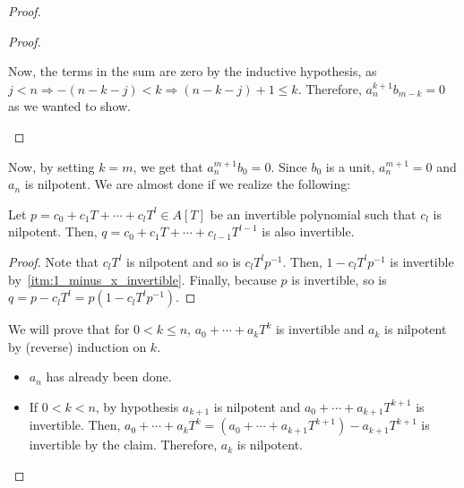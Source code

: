 \begin{problem}
\begin{enumerate}[label=(\theproblem.\arabic*),ref=\theproblem.\arabic*]
\begin{sol}
\begin{proof}
\begin{itemize}
\begin{claim}
\begin{proof}
\begin{itemize}
                                    Now, the terms in the sum are zero by the inductive hypothesis, as $j < n \Rightarrow -(n-k-j) < k \Rightarrow (n-k-j)+1 \leq k$.
                                    Therefore, $a_n^{k+1} b_{m-k} = 0$ as we wanted to show.
                                \end{itemize}
                            \end{proof}
                        \end{claim}
                        Now, by setting $k = m$, we get that $a_n^{m+1} b_0 = 0$.
                        Since $b_0$ is a unit, $a_n^{m+1} = 0$ and $a_n$ is nilpotent.
                        We are almost done if we realize the following:
                        \begin{claim}
                            Let $p = c_0 + c_1 T + \cdots + c_l T^l \in A[T]$ be an invertible polynomial such that $c_l$ is nilpotent.
                            Then, $q = c_0 + c_1 T + \cdots + c_{l-1} T^{l-1}$ is also invertible.
                            \begin{proof}
                                Note that $c_l T^l$ is nilpotent and so is $c_l T^l p^{-1}$.
                                Then, $1 - c_l T^l p^{-1}$ is invertible by~\ref{itm:1_minus_x_invertible}.
                                Finally, because $p$ is invertible, so is $q = p - c_l T^l = p (1 - c_l T^l p^{-1})$.
                            \end{proof}
                        \end{claim}
                        We will prove that for $0 < k \leq n$, $a_0 + \cdots + a_k T^k$ is invertible and $a_k$ is nilpotent by (reverse) induction on $k$.
                        \begin{itemize}
                            \item $a_n$ has already been done.
                            \item If $0 < k < n$, by hypothesis $a_{k+1}$ is nilpotent and $a_0 + \cdots + a_{k+1} T^{k+1}$ is invertible.
                            Then, $a_0 + \cdots + a_k T^k = (a_0 + \cdots + a_{k+1} T^{k+1}) - a_{k+1} T^{k+1}$ is invertible by the claim.
                            Therefore, $a_k$ is nilpotent.
                        \end{itemize}
                    \end{itemize}
                \end{proof}
            \end{sol}

\end{enumerate}
\end{problem}
